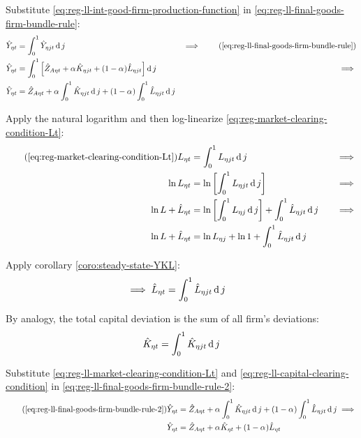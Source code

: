 \documentclass[../thesis.tex]{subfiles}
\begin{document}
Substitute \ref{eq:reg-ll-int-good-firm-production-function} in \ref{eq:reg-ll-final-goods-firm-bundle-rule}:
\begin{alignat}{2}
	\hat{Y}_{\eta t} &= \int_{0}^{1} \hat{Y}_{\eta jt} \dif j &\implies \tag{\ref{eq:reg-ll-final-goods-firm-bundle-rule}} \\
	\hat{Y}_{\eta t} &= \int_{0}^{1} \left[ \hat{Z}_{A\eta t} + {\alpha_{}} \hat{K}_{\eta jt} + (1-{\alpha_{}}) \hat{L}_{\eta jt} \right] \dif j &\implies \nonumber \\
	\hat{Y}_{\eta t} &= \hat{Z}_{A\eta t} + {\alpha_{}} \int_{0}^{1} \hat{K}_{\eta jt} \dif j + (1-{\alpha_{}}) \int_{0}^{1} \hat{L}_{\eta jt} \dif j \label{eq:reg-ll-final-goods-firm-bundle-rule-2}
\end{alignat}

Apply the natural logarithm and then log-linearize \ref{eq:reg-market-clearing-condition-Lt}:
\begin{alignat}{2}
	\tag{\ref{eq:reg-market-clearing-condition-Lt}}
	L_{\eta t} &= \int_{0}^{1} L_{\eta jt} \dif j &\implies \\
	\ln L_{\eta t} &= \ln \left[ \int_{0}^{1} L_{\eta jt} \dif j \right] &\implies \nonumber \\
	\ln L + \hat{L}_{\eta t} &= \ln \left[ \int_{0}^{1} L_{\eta j} \dif j \right] + \int_{0}^{1} \hat{L}_{\eta jt} \dif j \quad &\implies \nonumber \\
	\ln L + \hat{L}_{\eta t} &= \ln L_{\eta j} + \ln 1 + \int_{0}^{1} \hat{L}_{\eta jt} \dif j \nonumber
\end{alignat}

Apply corollary \ref{coro:steady-state-YKL}:
\begin{align}
	\implies \hat{L}_{\eta t} &= \int_{0}^{1} \hat{L}_{\eta jt} \operatorname{d} j \label{eq:reg-ll-market-clearing-condition-Lt}
\end{align}

By analogy, the total capital deviation is the sum of all firm's deviations:
\begin{align}
	\hat{K}_{\eta t} = \int_{0}^{1} \hat{K}_{\eta jt} \operatorname{d} j \label{eq:reg-ll-capital-clearing-condition}
\end{align}

Substitute \ref{eq:reg-ll-market-clearing-condition-Lt} and \ref{eq:reg-ll-capital-clearing-condition} in \ref{eq:reg-ll-final-goods-firm-bundle-rule-2}:
\begin{align}
	\tag{\ref{eq:reg-ll-final-goods-firm-bundle-rule-2}}
	\hat{Y}_{\eta t} &= \hat{Z}_{A\eta t} + {\alpha_{}} \int_{0}^{1} \hat{K}_{\eta jt} \dif j + (1-{\alpha_{}}) \int_{0}^{1} \hat{L}_{\eta jt} \dif j \implies \\
	\hat{Y}_{\eta t} &= \hat{Z}_{A\eta t} + {\alpha_{}} \hat{K}_{\eta t} + (1-{\alpha_{}}) \hat{L}_{\eta t} \label{eq:reg-ll-final-goods-firm-bundle-rule-3}
\end{align}
\end{document}
